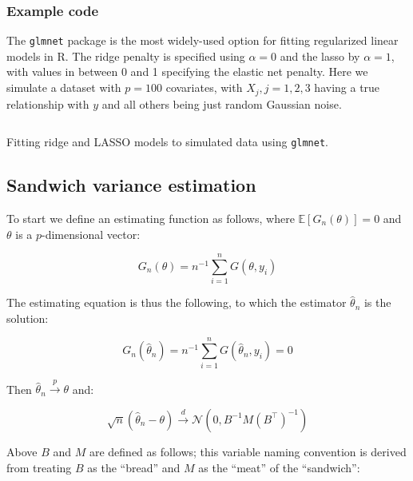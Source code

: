 \documentclass{report}
\begin{document}
\subsubsection{Example code}

The \texttt{glmnet} package is the most widely-used option for fitting regularized linear models in R. The ridge penalty is specified using $\alpha = 0$ and the \gls{lasso} by $\alpha = 1$, with values in between 0 and 1 specifying the elastic net penalty. Here we simulate a dataset with $p = 100$ covariates, with $X_j, j = 1, 2, 3$ having a true relationship with $y$ and all others being just random Gaussian noise. 

\begin{listing}[h!]
\inputminted{r}{Example-Code/ridge_and_lasso_gaussian.R}
\caption{Fitting ridge and LASSO models to simulated data using \texttt{glmnet}.}
\label{listing:glmnet-example}
\end{listing}

\subsection{Sandwich variance estimation}\label{sec:sandwich-variance-estimation}

To start we define an estimating function as follows, where $\mathbb{E}[G_n(\theta)] = 0$ and $\theta$ is a $p$-dimensional vector:

\begin{equation}\label{eq:ols-sandwich-est-function}
    G_n(\theta) = n^{-1} \sum_{i=1}^n G(\theta, y_i)
\end{equation}

The estimating equation is thus the following, to which the estimator $\hat{\theta}_n$ is the solution:

\begin{equation}\label{eq:ols-sandwich-est-equation}
    G_n\left(\hat{\theta}_n\right) = n^{-1} \sum_{i=1}^n G\left(\hat{\theta}_n, y_i\right) = 0
\end{equation}

Then $\hat{\theta}_n \overset{p}{\to} \theta$ and:

\begin{equation}\label{eq:ols-sandwich-asymptotic-dist}
    \sqrt{n}\left(\hat{\theta}_n - \theta\right) \overset{d}{\to} \mathcal{N}\left(0, B^{-1}M\left(B^\intercal\right)^{-1}\right)
\end{equation}

Above $B$ and $M$ are defined as follows; this variable naming convention is derived from treating $B$ as the ``bread'' and $M$ as the ``meat'' of the ``sandwich'':
\end{document}
